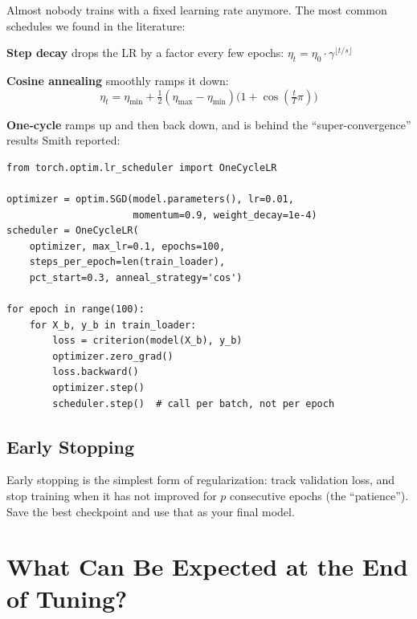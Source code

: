 \documentclass[12pt, letterpaper]{article}
\begin{document}
Almost nobody trains with a fixed learning rate anymore. The most common schedules we found in the literature:

\textbf{Step decay} drops the LR by a factor every few epochs:
$\eta_t = \eta_0 \cdot \gamma^{\lfloor t / s \rfloor}$

\textbf{Cosine annealing} smoothly ramps it down:
\begin{equation}
    \eta_t = \eta_{\min} + \tfrac{1}{2}(\eta_{\max} - \eta_{\min})\bigl(1 + \cos(\tfrac{t}{T}\pi)\bigr)
\end{equation}

\textbf{One-cycle} ramps up and then back down, and is behind the ``super-convergence'' results Smith reported:

\noindent\begin{minipage}{\linewidth}
\begin{lstlisting}[caption={One-cycle policy in PyTorch}]
from torch.optim.lr_scheduler import OneCycleLR

optimizer = optim.SGD(model.parameters(), lr=0.01,
                      momentum=0.9, weight_decay=1e-4)
scheduler = OneCycleLR(
    optimizer, max_lr=0.1, epochs=100,
    steps_per_epoch=len(train_loader),
    pct_start=0.3, anneal_strategy='cos')

for epoch in range(100):
    for X_b, y_b in train_loader:
        loss = criterion(model(X_b), y_b)
        optimizer.zero_grad()
        loss.backward()
        optimizer.step()
        scheduler.step()  # call per batch, not per epoch
\end{lstlisting}
\end{minipage}

\subsection{Early Stopping}

Early stopping is the simplest form of regularization: track validation loss, and stop training when it has not improved for $p$ consecutive epochs (the ``patience''). Save the best checkpoint and use that as your final model.

\section{What Can Be Expected at the End of Tuning?}
\end{document}
